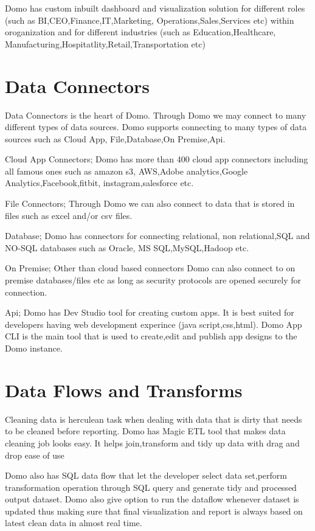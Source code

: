 Domo has custom inbuilt dashboard and visualization solution 
for different roles (such as BI,CEO,Finance,IT,Marketing,
Operations,Sales,Services etc)  within oroganization and 
for different industries (such as Education,Healthcare,
Manufacturing,Hospitatlity,Retail,Transportation etc)


\section{Data Connectors}
Data Connectors is the heart of Domo. Through Domo we may 
connect to many different types of data sources. Domo supports 
connecting to many types of data sources such as  Cloud App,
File,Database,On Premise,Api.

Cloud App Connectors; Domo has  more than 400 cloud app 
connectors including all famous ones such as amazon s3,
AWS,Adobe analytics,Google Analytics,Facebook,fitbit,
instagram,salesforce etc. 

File Connectors; Through Domo we can also connect to data 
that is stored in files such as excel and/or csv files.

Database; Domo has connectors for connecting relational,
non relational,SQL and NO-SQL databases such as Oracle,
MS SQL,MySQL,Hadoop etc.

On Premise; Other than cloud based connectors Domo can also 
connect to on premise databases/files etc as long as security 
protocols are opened securely for connection.

Api; Domo has Dev Studio tool for creating custom apps. 
It is best suited for developers having web development 
experince (java script,css,html). Domo App CLI is the 
main tool that is used to create,edit and publish app designs 
to the Domo instance.


\section{Data Flows and Transforms}

Cleaning data is herculean task when dealing with data that 
is dirty that needs to be cleaned before reporting. Domo has 
Magic ETL tool that makes data cleaning job looks easy. 
It helps join,transform and tidy up data with drag and 
drop ease of use~\cite{hid-sp18-523-Dev} 

Domo also has SQL data flow that let the developer select 
data set,perform transformation operation through SQL query 
and generate tidy and processed output dataset. Domo also 
give option to run the dataflow whenever dataset is updated 
thus making sure that final visualization and report is 
always based on latest clean data in almost real time.


